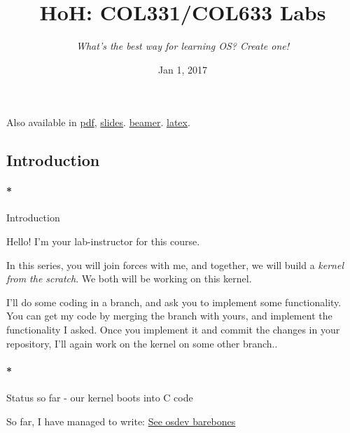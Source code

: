 \documentclass[]{article}
\title{HoH: COL331/COL633 Labs}
\subtitle{\emph{What's the best way for learning OS? Create one!}}
\date{Jan 1, 2017}
\let\oldparagraph\paragraph
\renewcommand{\paragraph}[1]{\oldparagraph{#1}\mbox{}}
\begin{document}
\maketitle

Also available in \href{index.pdf}{pdf},
\href{index.slides.html}{slides}. \href{index.beamer.pdf}{beamer}.
\href{index.tex}{latex}.

\subsection*{Introduction}\label{introduction}

\paragraph*{Introduction}\label{introduction-1}

Hello! I'm your lab-instructor for this course.

In this series, you will join forces with me, and together, we will
build a \emph{kernel from the scratch}. We both will be working on this
kernel.

I'll do some coding in a branch, and ask you to implement some
functionality. You can get my code by merging the branch with yours, and
implement the functionality I asked. Once you implement it and commit
the changes in your repository, I'll again work on the kernel on some
other branch..

\paragraph*{Status so far - our kernel boots into C
code}\label{status-so-far---our-kernel-boots-into-c-code}

So far, I have managed to write:
\href{http://wiki.osdev.org/Bare_bones}{See osdev barebones}
\end{document}
